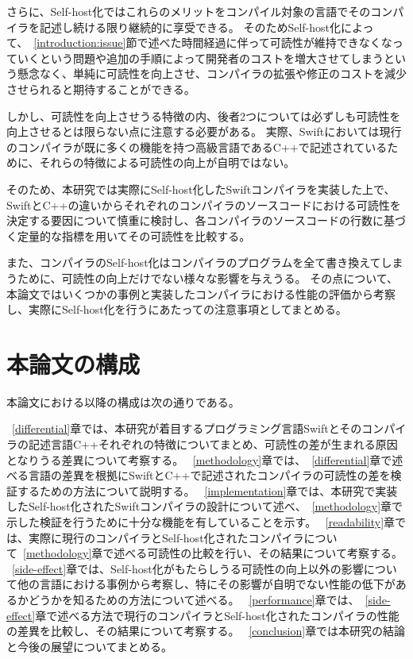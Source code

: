 さらに、Self-host化ではこれらのメリットをコンパイル対象の言語でそのコンパイラを記述し続ける限り継続的に享受できる。
そのためSelf-host化によって、~\ref{introduction:issue}節で述べた時間経過に伴って可読性が維持できなくなっていくという問題や追加の手順によって開発者のコストを増大させてしまうという懸念なく、単純に可読性を向上させ、コンパイラの拡張や修正のコストを減少させられると期待することができる。

しかし、可読性を向上させうる特徴の内、後者2つについては必ずしも可読性を向上させるとは限らない点に注意する必要がある。
実際、Swiftにおいては現行のコンパイラが既に多くの機能を持つ高級言語であるC++で記述されているために、それらの特徴による可読性の向上が自明ではない。

そのため、本研究では実際にSelf-host化したSwiftコンパイラを実装した上で、SwiftとC++の違いからそれぞれのコンパイラのソースコードにおける可読性を決定する要因について慎重に検討し、各コンパイラのソースコードの行数に基づく定量的な指標を用いてその可読性を比較する。

また、コンパイラのSelf-host化はコンパイラのプログラムを全て書き換えてしまうために、可読性の向上だけでない様々な影響を与えうる。
その点について、本論文ではいくつかの事例と実装したコンパイラにおける性能の評価から考察し、実際にSelf-host化を行うにあたっての注意事項としてまとめる。


\section{本論文の構成}

本論文における以降の構成は次の通りである。

~\ref{differential}章では、本研究が着目するプログラミング言語Swiftとそのコンパイラの記述言語C++それぞれの特徴についてまとめ、可読性の差が生まれる原因となりうる差異について考察する。
~\ref{methodology}章では、~\ref{differential}章で述べる言語の差異を根拠にSwiftとC++で記述されたコンパイラの可読性の差を検証するための方法について説明する。
~\ref{implementation}章では、本研究で実装したSelf-host化されたSwiftコンパイラの設計について述べ、~\ref{methodology}章で示した検証を行うために十分な機能を有していることを示す。
~\ref{readability}章では、実際に現行のコンパイラとSelf-host化されたコンパイラについて~\ref{methodology}章で述べる可読性の比較を行い、その結果について考察する。
~\ref{side-effect}章では、Self-host化がもたらしうる可読性の向上以外の影響について他の言語における事例から考察し、特にその影響が自明でない性能の低下があるかどうかを知るための方法について述べる。
~\ref{performance}章では、~\ref{side-effect}章で述べる方法で現行のコンパイラとSelf-host化されたコンパイラの性能の差異を比較し、その結果について考察する。
~\ref{conclusion}章では本研究の結論と今後の展望についてまとめる。

